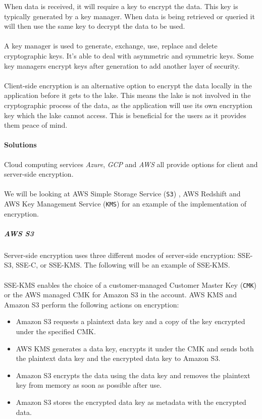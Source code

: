 \documentclass[10pt]{article}
\begin{document}
When data is received, it will require a key to encrypt the data. This key is typically generated by a key manager. When data is being retrieved or queried it will then use the same key to decrypt the data to be used.
\\ \\
A key manager is used to generate, exchange, use, replace and delete cryptographic keys. It's able to deal with asymmetric and symmetric keys. Some key managers encrypt keys after generation to add another layer of security.
\\ \\
Client-side encryption is an alternative option to encrypt the data locally in the application before it gets to the lake. This means the lake is not involved in the cryptographic process of the data, as the application will use its own encryption key which the lake cannot access. This is beneficial for the users as it provides them peace of mind.
\paragraph{Solutions} 
Cloud computing services \textit{Azure}, \textit{GCP} and \textit{AWS} all provide options for client and server-side encryption.
\\ \\
We will be looking at AWS Simple Storage Service (\texttt{S3}) \cite{encryption-in-s3}, AWS Redshift \cite{encryption-in-redshift} and AWS Key Management Service (\texttt{KMS}) for an example of the implementation of encryption.
\subparagraph{AWS S3}
Server-side encryption uses three different modes of server-side encryption: SSE-S3, SSE-C, or SSE-KMS. The following will be an example of SSE-KMS.
\\ \\ 
SSE-KMS enables the choice of a customer-managed Customer Master Key (\texttt{CMK}) or the AWS managed CMK for Amazon S3 in the account. AWS KMS and Amazon S3 perform the following actions on encryption:
\begin{itemize}
  \item Amazon S3 requests a plaintext data key and a copy of the key encrypted under the specified CMK.
  \item AWS KMS generates a data key, encrypts it under the CMK and sends both the plaintext data key and the encrypted data key to Amazon S3.
  \item Amazon S3 encrypts the data using the data key and removes the plaintext key from memory as soon as possible after use.
  \item Amazon S3 stores the encrypted data key as metadata with the encrypted data.
\end{itemize}
\end{document}

